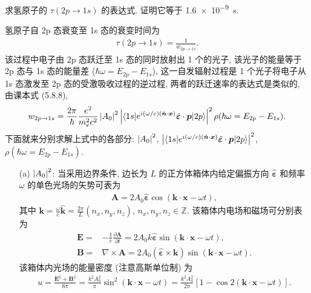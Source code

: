 \documentclass{assignment}
\begin{document}
\begin{prob}[课本习题 5.42]
    求氢原子的 $\tau(2p\rightarrow 1s)$ 的表达式. 证明它等于 \SI{1.6e-9}{s}.
\end{prob}
\begin{pf}
    氢原子自 2p 态衰变至 1s 态的衰变时间为
    \begin{align}
        \tau(2p\rightarrow 1s)=\frac{1}{w_{2p\rightarrow 1s}}.
    \end{align}
    该过程中电子由 2p 态跃迁至 1s 态的同时放射出 1 个的光子, 该光子的能量等于 2p 态与 1s 态的能量差 ($\hbar\omega=E_{2p}-E_{1s}$), 这一自发辐射过程是 1 个光子将电子从 1s 态激发至 2p 态的受激吸收过程的逆过程, 两者的跃迁速率的表达式是类似的, 由课本式 (5.8.8),
    \begin{align}
        w_{2p\rightarrow 1s}=\frac{2\pi}{\hbar}\frac{e^2}{m_e^2c^2}\left\lvert A_0\right\rvert^2\left\lvert\langle 1s\rvert e^{i(\omega/c)(\hat{\bm{n}}\cdot\bm{x})}\hat{\bm{\varepsilon}}\cdot\bm{p}\lvert 2p\rangle\right\rvert^2\rho(\hbar\omega=E_{2p}-E_{1s}).
    \end{align}
    下面就来分别求解上式中的各部分: $\left\lvert A_0\right\rvert^2$, $\left\lvert\langle 1s\rvert e^{i(\omega/c)(\hat{\bm{n}}\cdot\bm{x})}\hat{\bm{\varepsilon}}\cdot\bm{p}\lvert 2p\rangle\right\rvert^2$, $\rho(\hbar\omega=E_{2p}-E_{1s})$.
    \begin{itemize}
        \item[(a)] \uline{$\left\lvert A_0\right\rvert^2$}: 当采用边界条件, 边长为 $L$ 的正方体箱体内给定偏振方向 $\hat{\bm{\varepsilon}}$ 和频率 $\omega$ 的单色光场的矢势可表为
        \begin{align}
            \bm{A}=2A_0\hat{\bm{\varepsilon}}\cos\left(\bm{k}\cdot\bm{x}-\omega t\right),
        \end{align}
        其中 $\bm{k}=\frac{\omega}{c}\hat{\bm{k}}=\frac{2\pi}{L}(n_x,n_y,n_z)$, $n_x,n_y,n_z\in\mathbb{Z}$.
        该箱体内电场和磁场可分别表为
        \begin{align}
            \bm{E}=&-\frac{1}{c}\frac{\partial\bm{A}}{\partial t}=2A_0k\hat{\bm{\varepsilon}}\sin(\bm{k}\cdot\bm{x}-\omega t),\\
            \bm{B}=&\nabla\times\bm{A}=2A_0(\hat{\bm{\varepsilon}}\times\bm{k})\sin(\bm{k}\cdot\bm{x}-\omega t).
        \end{align}
        该箱体内光场的能量密度 (注意高斯单位制) 为
        \begin{align}
            u=\frac{\bm{E}^2+\bm{B}^2}{8\pi}=\frac{k^2A_0^2}{\pi}\sin^2(\bm{k}\cdot\bm{x}-\omega t)=\frac{k^2A_0^2}{2\pi}[1-\cos 2(\bm{k}\cdot\bm{x}-\omega t)].
        \end{align}

\end{itemize}
\end{pf}
\end{document}
